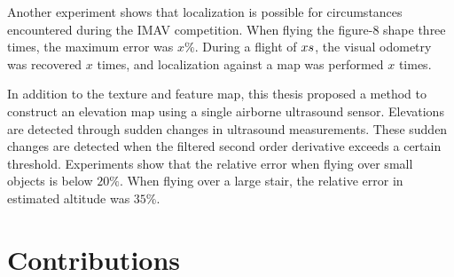 Another experiment shows that localization is possible for circumstances encountered during the IMAV competition.
When flying the figure-8 shape three times, the maximum error was $x\%$.
During a flight of $x\small{s}$, the visual odometry was recovered $x$ times, and localization against a map was performed $x$ times.

In addition to the texture and feature map, this thesis proposed a method to construct an elevation map using a single airborne ultrasound sensor.
Elevations are detected through sudden changes in ultrasound measurements.
These sudden changes are detected when the filtered second order derivative exceeds a certain threshold.
Experiments show that the relative error when flying over small objects is below $20\%$.
When flying over a large stair, the relative error in estimated altitude was $35\%$.








\begin{comment}
The main research question therefore is to determine a realtime Simultaneous Localization and Mapping approach that can be used for MAVs with a low-resolution down-pointing camera (e.g., AR.Drone).
This main research question is divided into several subquestions:
\begin{itemize}
\item How to construct (visual) a map from camera frames?
\item What camera resolution (e.g., $176 \times 144$ pixels) is required for localization against a map? What is the relationship between camera resolution and the localization performance?
\item What is the performance and robustness of different methods to estimate the transformation between a camera frame and a map?
\item Is localization on regular basis possible for circumstances encountered during the IMAV competition?
\item How to construct an elevation map with a single ultrasound sensor?
\end{itemize}
\end{comment}







\section{Contributions}
\label{sec:conclusions-contributions}

